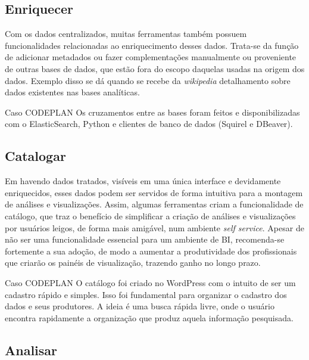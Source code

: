     
    \subsection{Enriquecer} \label{sec:enriquecer}
    
    
Com os dados centralizados, muitas ferramentas também possuem funcionalidades relacionadas ao enriquecimento desses dados. Trata-se da função de adicionar metadados ou fazer complementações manualmente ou proveniente de outras bases de dados, que estão fora do escopo daquelas usadas na origem dos dados. Exemplo disso se dá quando se recebe da \emph{wikipedia} detalhamento sobre dados existentes nas bases analíticas.

\begin{env-caso}{Caso CODEPLAN}
Os cruzamentos entre as bases foram feitos e disponibilizadas com o ElasticSearch, Python e clientes de banco de dados (Squirel e DBeaver).
\end{env-caso}
    
    \subsection{Catalogar} \label{sec:catalogar}
    
    Em havendo dados tratados, visíveis em uma única interface e devidamente enriquecidos, esses dados podem ser servidos de forma intuitiva para a montagem de análises e visualizações. Assim, algumas ferramentas criam a funcionalidade de catálogo, que traz o benefício de simplificar a criação de análises e visualizações por usuários leigos, de forma mais amigável, num ambiente \emph{self service}. Apesar de não ser uma funcionalidade essencial para um ambiente de BI, recomenda-se fortemente a sua adoção, de modo a aumentar a produtividade dos profissionais que criarão os painéis de visualização, trazendo ganho no longo prazo.


\begin{env-caso}{Caso CODEPLAN}
O catálogo foi criado no WordPress com o intuito de ser um cadastro rápido e simples. Isso foi fundamental para organizar o cadastro dos dados e seus produtores. A ideia é uma busca rápida livre, onde o usuário encontra rapidamente a organização que produz aquela informação pesquisada.
\end{env-caso}
    
    \subsection{Analisar} \label{sec:analisar}
    
